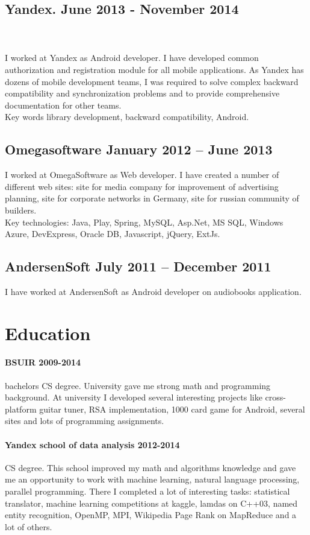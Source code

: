 \documentclass{article}
\begin{document}
\subsection*{Yandex. June 2013 - November 2014}\\\\
I worked at Yandex as Android developer. I have developed common authorization and registration module for all mobile applications. As Yandex has dozens of mobile development teams, I was required to solve complex backward compatibility and synchronization problems and to provide comprehensive documentation for other teams.\\
Key words library development, backward compatibility, Android.

\subsection*{Omegasoftware January 2012 – June 2013}
I worked at OmegaSoftware as Web developer. I have created a number of different web sites: site for media company for improvement of advertising planning, site for corporate networks in Germany, site for russian community of builders.\\
Key technologies: Java, Play, Spring, MySQL, Asp.Net, MS SQL, Windows Azure, DevExpress, Oracle DB, Javascript, jQuery, ExtJs.

\subsection*{AndersenSoft July 2011 – December 2011}
I have worked at AndersenSoft as Android developer on audiobooks application.

\section*{Education}
\paragraph{BSUIR 2009-2014} bachelors CS degree. University gave me strong math and programming background. At university I developed several interesting projects like cross-platform guitar tuner, RSA implementation, 1000 card game for Android, several sites and lots of programming assignments.
\paragraph{Yandex school of data analysis 2012-2014} CS degree. This school improved my math and algorithms knowledge and gave me an opportunity to work with machine learning, natural language processing, parallel programming. There I completed a lot of interesting tasks: statistical translator, machine learning competitions at kaggle, lamdas on C++03, named entity recognition, OpenMP, MPI, Wikipedia Page Rank on MapReduce and a lot of others.
\end{document}
